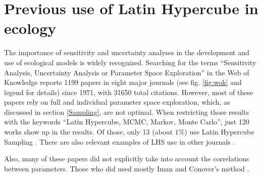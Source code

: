 \section{Previous use of Latin Hypercube in ecology}\label{Studies}
The importance of sensitivity and uncertainty analyses in the development 
and use of ecological models is widely recognized. Searching for the terms
``Sensitivity Analysis, Uncertainty Analysis or Parameter Space
Exploration'' in the Web of Knowledge reports 1199 papers in eight major
journals (see fig. \ref{fig:wok} and legend for details) since 1971, 
with 31650 total
citations. However,
most of these papers rely on full and individual parameter space
exploration, which, as discussed in section \ref{Sampling}, are not
optimal. When restricting those results with the keywords ``Latin Hypercube,
MCMC, Markov, Monte Carlo'', just 120 works show up in the results. Of 
those, only 13 (about $1\%$) use Latin Hypercube Sampling 
\cite{Berthaume12, Confalonieri10, Meyer07, Tiemeyer07, Xu05,
Moore04, Shirley03, Duchesne03, Reed84, Marino08, Nathan01, Hamilton10,
Lovvorn96}. There are also relevant examples of LHS use in other
journals \cite{Estill12, Fisher10, Thebault10}.

Also, many of these papers did not explicitly take into account the
correlations between parameters. Those who did used mostly Iman and 
Conover's method \cite{ImanConover82}. 

